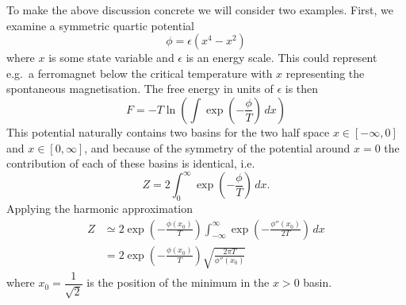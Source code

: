 \documentclass[11pt,twoside]{report}
\begin{document}
To make the above discussion concrete we will consider two examples.
First, we examine a symmetric quartic potential
\begin{equation}
  \phi = \epsilon (x^4 - x^2)
\end{equation}
where $x$ is some state variable and $\epsilon$ is an energy scale.
This could represent e.g.\ a ferromagnet below the critical temperature with $x$ representing the spontaneous magnetisation.
The free energy in units of $\epsilon$ is then
\begin{equation}
  F = - T \ln{\left( \int \exp{\left(-\frac{\phi}{T}\right)} \, dx \right)}
\end{equation}
This potential naturally contains two basins for the two half space $x \in [-\infty, 0]$ and $x \in [0, \infty]$, and because of the symmetry of the potential around $x=0$ the contribution of each of these basins is identical, i.e.\
\begin{equation}
  Z = 2 \int_0^\infty \exp{\left(-\frac{\phi}{T}\right)} \, dx.
\end{equation}
Applying the harmonic approximation
\begin{equation}
  \begin{split}
  Z &\simeq
  2 \exp{\left( -\frac{\phi(x_0)}{T} \right)}
  \int_{-\infty}^\infty \exp{\left(-\frac{\phi''(x_0)}{2T}\right)} \, dx \\
  &=
  2 \exp{\left( -\frac{\phi(x_0)}{T} \right)}
  \sqrt{\frac{2 \pi T}{\phi''(x_0)}}
  \end{split}
\end{equation}
where $x_0 = \dfrac{1}{\sqrt{2}}$ is the position of the minimum in the $x > 0$ basin.
\end{document}

